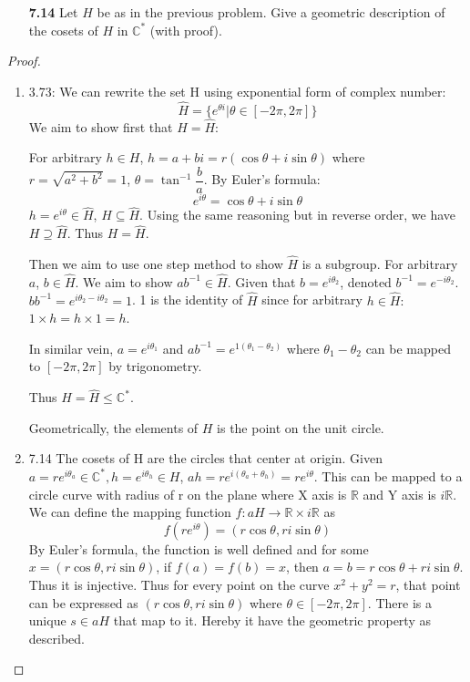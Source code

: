 \documentclass[11pt, oneside]{article}
\newcommand{\C}{\mathbb C}
\newcommand{\R}{\mathbb R}
\begin{document}
\begin{enumerate}
\begin{enumerate}
\item[{\bf 7.14}] Let $H$ be as in the previous problem. Give a geometric description  of the cosets of $H$ in $\C^*$ (with proof).\\
\end{enumerate}
\begin{proof}
\begin{enumerate}
    \item 3.73: We can rewrite the set H using exponential form of complex number:
    \[\hat{H}=\{e^{\theta i}| \theta\in [-2\pi,2\pi]\}\]
    We aim to show first that $H=\hat{H}$:
    
    For arbitrary $h\in H$, $h=a+bi=r(\cos \theta +i\sin \theta)$ where $r=\sqrt{a^2+b^2}=1$, $\theta= \tan^{-1}\dfrac{b}{a}$. By Euler's formula:
    \[e^{i\theta}=\cos \theta +i\sin \theta \]
    $h=e^{i\theta}\in \hat{H}$, $H\subseteq \hat{H}$. Using the same reasoning but in reverse order, we have $H\supseteq \hat{H}$. Thus $H=\hat{H}$. 
    
    Then we aim to use one step method to show $\hat{H}$ is a subgroup. For arbitrary $a$, $b\in \hat{H}$. We aim to show $ab^{-1}\in \hat{H}$. 
    \newline Given that $b=e^{i\theta_2}$, denoted $b^{-1}=e^{-i\theta_2}$. $bb^{-1}=e^{i\theta_2-i\theta_2}=1$. 1 is the identity of $\hat{H}$ since for arbitrary $h\in \hat{H}:$ $1\times h= h\times 1 =h$. 
    
    \newline In similar vein, $a=e^{i\theta_1}$ and $ab^{-1}=e^{1(\theta_1-\theta_2)}$ where $\theta_1-\theta_2$ can be mapped to $[-2\pi, 2\pi]$ by trigonometry. 
    
    Thus $H=\hat{H}\leq \C^*$.
    
    Geometrically, the elements of $H$ is the point on the unit circle.
    
    \item 7.14 The cosets of H are the circles that center at origin. 
    \newline Given $a= re^{i\theta_a}\in \C^*, h=e^{i\theta_h}\in H$, $ah=re^{i(\theta_a+\theta_h)}=re^{i\theta}$. This can be mapped to a circle curve with radius of r on the plane where X axis is $\R$ and Y axis is $i\R$. We can define the mapping function 
    $f:aH \longrightarrow \R\times i\R$ as 
    \[f(re^{i\theta})=(r\cos\theta, ri\sin\theta)\]
    By Euler's formula, the function is well defined and for some $x=(r\cos\theta, ri\sin\theta)$, if $f(a)=f(b)=x$, then $a=b=r\cos\theta+ ri\sin\theta$. Thus it is injective. Thus for every point on the curve $x^2+y^2=r$, that point can be expressed as $(r\cos\theta, ri\sin\theta)$ where $\theta\in [-2\pi, 2\pi]$. There is a unique $s\in aH$ that map to it. Hereby it have the geometric property as described. 
\end{enumerate}
\end{proof}

 

\end{enumerate}
\end{document}
